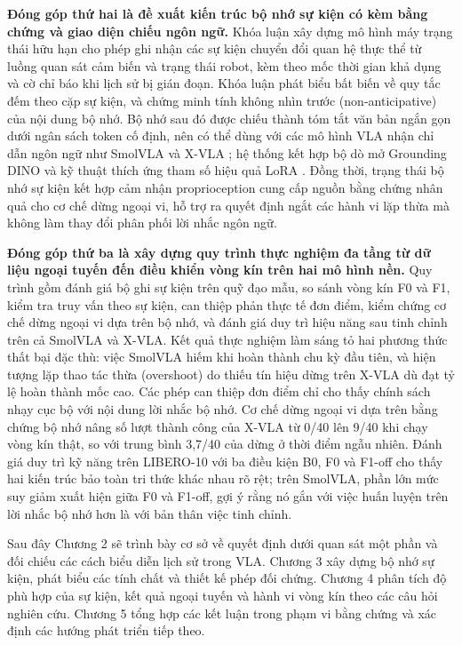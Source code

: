 \textbf{Đóng góp thứ hai là đề xuất kiến trúc bộ nhớ sự kiện có kèm bằng chứng và giao diện chiếu ngôn ngữ.} Khóa luận xây dựng mô hình máy trạng thái hữu hạn cho phép ghi nhận các sự kiện chuyển đổi quan hệ thực thể từ luồng quan sát cảm biến và trạng thái robot, kèm theo mốc thời gian khả dụng và cờ chỉ báo khi lịch sử bị gián đoạn. Khóa luận phát biểu bất biến về quy tắc đếm theo cặp sự kiện, và chứng minh tính không nhìn trước (non-anticipative) của nội dung bộ nhớ. Bộ nhớ sau đó được chiếu thành tóm tắt văn bản ngắn gọn dưới ngân sách token cố định, nên có thể dùng với các mô hình VLA nhận chỉ dẫn ngôn ngữ như SmolVLA \cite{smolvla2025} và X-VLA \cite{xvla2025}; hệ thống kết hợp bộ dò mở Grounding DINO \cite{groundingdino2024} và kỹ thuật thích ứng tham số hiệu quả LoRA \cite{lora2021}. Đồng thời, trạng thái bộ nhớ sự kiện kết hợp cảm nhận proprioception cung cấp nguồn bằng chứng nhân quả cho cơ chế dừng ngoại vi, hỗ trợ ra quyết định ngắt các hành vi lặp thừa mà không làm thay đổi phân phối lời nhắc ngôn ngữ.

\textbf{Đóng góp thứ ba là xây dựng quy trình thực nghiệm đa tầng từ dữ liệu ngoại tuyến đến điều khiển vòng kín trên hai mô hình nền.} Quy trình gồm đánh giá bộ ghi sự kiện trên quỹ đạo mẫu, so sánh vòng kín F0 và F1, kiểm tra truy vấn theo sự kiện, can thiệp phản thực tế đơn điểm, kiểm chứng cơ chế dừng ngoại vi dựa trên bộ nhớ, và đánh giá duy trì hiệu năng sau tinh chỉnh trên cả SmolVLA và X-VLA. Kết quả thực nghiệm làm sáng tỏ hai phương thức thất bại đặc thù: việc SmolVLA hiếm khi hoàn thành chu kỳ đầu tiên, và hiện tượng lặp thao tác thừa (overshoot) do thiếu tín hiệu dừng trên X-VLA dù đạt tỷ lệ hoàn thành mốc cao. Các phép can thiệp đơn điểm chỉ cho thấy chính sách nhạy cục bộ với nội dung lời nhắc bộ nhớ. Cơ chế dừng ngoại vi dựa trên bằng chứng bộ nhớ nâng số lượt thành công của X-VLA từ 0/40 lên 9/40 khi chạy vòng kín thật, so với trung bình 3,7/40 của dừng ở thời điểm ngẫu nhiên. Đánh giá duy trì kỹ năng trên LIBERO-10 với ba điều kiện B0, F0 và F1-off cho thấy hai kiến trúc bảo toàn tri thức khác nhau rõ rệt; trên SmolVLA, phần lớn mức suy giảm xuất hiện giữa F0 và F1-off, gợi ý rằng nó gắn với việc huấn luyện trên lời nhắc bộ nhớ hơn là với bản thân việc tinh chỉnh.

Sau đây Chương 2 sẽ trình bày cơ sở về quyết định dưới quan sát một phần và đối chiếu các cách biểu diễn lịch sử trong VLA. Chương 3 xây dựng bộ nhớ sự kiện, phát biểu các tính chất và thiết kế phép đối chứng. Chương 4 phân tích độ phù hợp của sự kiện, kết quả ngoại tuyến và hành vi vòng kín theo các câu hỏi nghiên cứu. Chương 5 tổng hợp các kết luận trong phạm vi bằng chứng và xác định các hướng phát triển tiếp theo.
